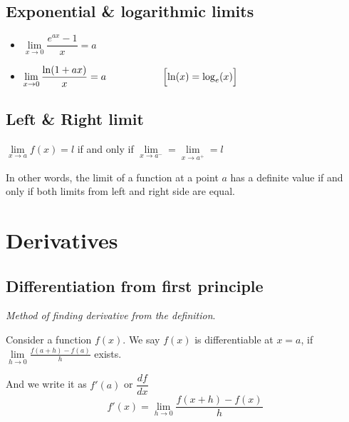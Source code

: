 \documentclass{article}
\begin{document}
\subsection{Exponential \& logarithmic limits}
\begin{itemize}
  \item $\lim\limits_{x \to 0}\dfrac{e^{ax} - 1}{x} = a$
  \item $\lim\limits_{x \to 0}\dfrac{\ln(1 + ax)}{x} = a \hspace{2cm} \Bigl[\ln(x) = \log_e(x)\Bigr] $
\end{itemize}

\subsection{Left \& Right limit}
\par \hspace{.3cm} $\lim\limits_{x \to a}f(x) = l$\hspace{.3cm} if and only if \hspace{.2cm} $\lim\limits_{x \to a^-} = \lim\limits_{x \to a^+} = l$
\par In other words, the limit of a function at a point $a$ has a definite value if and only if both limits from left and right side are equal.

\maketitle
\section{Derivatives}
\subsection{Differentiation from first principle}

\par \hspace{.4cm}\textit{Method of finding derivative from the definition}.\\
\par Consider a function $f(x)$. We say $f(x)$ is differentiable at $x=a$, if
\hspace{.15cm} $\lim\limits_{h \to 0}\frac{f(a + h) - f(a)}{h}$
\hspace{.15cm} exists.
\par And we write it as $f'(a)$ or $\dfrac{df}{dx}$\\
\[f'(x) = \lim\limits_{h \to 0}\frac{f(x + h) - f(x)}{h}\]
\end{document}
